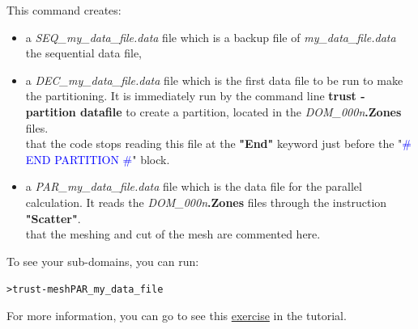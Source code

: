This command creates:
\begin{itemize} 
\item a \textit{SEQ\_my\_data\_file.data} file which is a backup file of \textit{my\_data\_file.data} the sequential data file,
\item a \textit{DEC\_my\_data\_file.data} file which is the first data file to be run to make the partitioning. It is immediately run by the command line \textbf{trust -partition datafile} to create a partition, located in the \textit{DOM\_000n}\textbf{.Zones} files. \\
\Note that the code stops reading this file at the \textbf{"End"} keyword just before the "\textcolor{blue}{\# END PARTITION \#}" block.
\item a \textit{PAR\_my\_data\_file.data} file which is the data file for the parallel calculation. It reads the \textit{DOM\_000n}\textbf{.Zones} files through the instruction \textbf{"Scatter"}.\\
\Note that the meshing and cut of the mesh are commented here.
\end{itemize}

To see your sub-domains, you can run:
\begin{alltt} 
> trust -mesh PAR_my_data_file
\end{alltt}

For more information, you can go to see this \href{TRUST_tutorial.pdf\#exo_para_2}{exercise} in the \trust tutorial.



